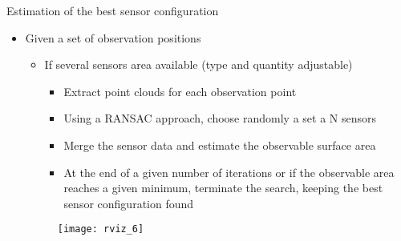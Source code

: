 \begin{frame}{Estimation of the best sensor configuration}
	\begin{itemize}
		\item Given a set of observation positions
		\begin{itemize}
			\item If several sensors area available (type and quantity adjustable)
			\begin{itemize}
				\item Extract point clouds for each observation point
				\item Using a RANSAC approach, choose randomly a set a N sensors
				\item Merge the sensor data and estimate the observable surface area
				\item At the end of a given number of iterations or if the observable area reaches a given minimum, terminate the search, keeping the best sensor configuration found
			\end{itemize}
		\end{itemize}
		\begin{figure}[!ht]
			\centering
			\texttt{[image: rviz\_6]}
		\end{figure}
	\end{itemize}
\end{frame}
